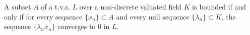A subset $A$ of a t.v.s. $L$ over a non-discrete valuated field $K$ is bounded if and only if for every sequence $\{x_n\} \subset A$ and every null sequence $\{\lambda_n\} \subset K$, the sequence $\{\lambda_n x_n\}$ converges to $0$ in $L$.
